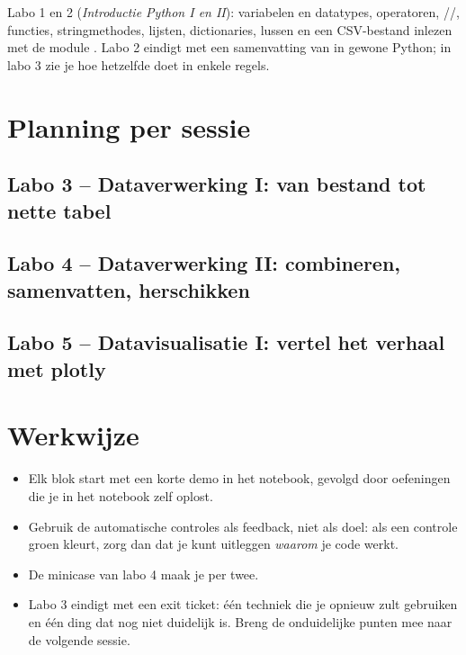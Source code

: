 \documentclass[11pt,a4paper]{article}
\begin{document}
Labo 1 en 2 (\emph{Introductie Python I en II}): variabelen en datatypes,
operatoren, //, functies,
stringmethodes, lijsten, dictionaries, lussen en een CSV-bestand inlezen
met de module . Labo 2 eindigt met een samenvatting van
 in gewone Python; in labo 3 zie je hoe 
hetzelfde doet in enkele regels.





\section{Planning per sessie}

\subsection{Labo 3 -- Dataverwerking I: van bestand tot nette tabel}


\subsection{Labo 4 -- Dataverwerking II: combineren, samenvatten, herschikken}


\subsection{Labo 5 -- Datavisualisatie I: vertel het verhaal met plotly}


\section{Werkwijze}

\begin{itemize}
  \item Elk blok start met een korte demo in het notebook, gevolgd door
        oefeningen die je in het notebook zelf oplost.
  \item Gebruik de automatische controles als feedback, niet als doel:
        als een controle groen kleurt, zorg dan dat je kunt uitleggen
        \emph{waarom} je code werkt.
  \item De minicase van labo 4 maak je per twee.
  \item Labo 3 eindigt met een exit ticket: één techniek die je opnieuw
        zult gebruiken en één ding dat nog niet duidelijk is. Breng de
        onduidelijke punten mee naar de volgende sessie.
\end{itemize}
\end{document}
